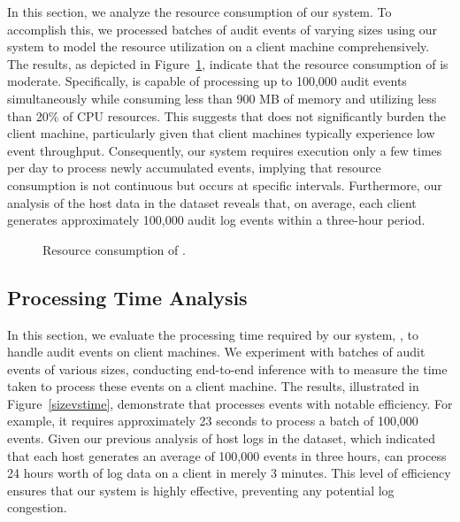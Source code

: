  In this section, we analyze the resource consumption of our system. To accomplish this, we processed batches of audit events of varying sizes using our system to model the resource utilization on a client machine comprehensively. The results, as depicted in Figure~\ref{fig:resource}, indicate that the resource consumption of \Sys is moderate. Specifically, \Sys is capable of processing up to 100,000 audit events simultaneously while consuming less than 900 MB of memory and utilizing less than 20\% of CPU resources. This suggests that \Sys does not significantly burden the client machine, particularly given that client machines typically experience low event throughput. Consequently, our system requires execution only a few times per day to process newly accumulated events, implying that resource consumption is not continuous but occurs at specific intervals. Furthermore, our analysis of the host data in the \optc dataset reveals that, on average, each client generates approximately 100,000 audit log events within a three-hour period.

 \begin{figure}[t!]
  \centering
  \hfill
  \hfill
  \caption{Resource consumption of \Sys. }
  \label{fig:resource}
  \vspace{-2ex}
\end{figure}

 \subsection{Processing Time Analysis}

 In this section, we evaluate the processing time required by our system, \Sys, to handle audit events on client machines. We experiment with batches of audit events of various sizes, conducting end-to-end inference with \Sys to measure the time taken to process these events on a client machine. The results, illustrated in Figure~\ref{sizevstime}, demonstrate that \Sys processes events with notable efficiency. For example, it requires approximately 23 seconds to process a batch of 100,000 events. Given our previous analysis of host logs in the \optc dataset, which indicated that each host generates an average of 100,000 events in three hours, \Sys can process 24 hours worth of log data on a client in merely 3 minutes. This level of efficiency ensures that our system is highly effective, preventing any potential log congestion.

